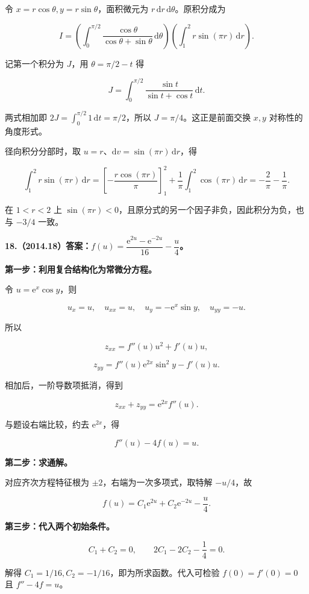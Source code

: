 \documentclass[UTF8,11pt,fontset=windows]{ctexart}
\begin{document}
令 $x=r\cos\theta,y=r\sin\theta$，面积微元为 $r\,\mathrm dr\,\mathrm d\theta$。原积分成为

$$
I=\left(\int_0^{\pi/2}\frac{\cos\theta}{\cos\theta+\sin\theta}\,\mathrm d\theta\right)
\left(\int_1^2r\sin(\pi r)\,\mathrm dr\right).
$$

记第一个积分为 $J$，用 $\theta=\pi/2-t$ 得

$$
J=\int_0^{\pi/2}\frac{\sin t}{\sin t+\cos t}\,\mathrm dt.
$$

两式相加即 $2J=\int_0^{\pi/2}1\,\mathrm dt=\pi/2$，所以 $J=\pi/4$。这正是前面交换 $x,y$ 对称性的角度形式。

径向积分分部时，取 $u=r$、$\mathrm dv=\sin(\pi r)\,\mathrm dr$，得

$$
\int_1^2r\sin(\pi r)\,\mathrm dr
=\left[-\frac{r\cos(\pi r)}\pi\right]_1^2
+\frac1\pi\int_1^2\cos(\pi r)\,\mathrm dr
=-\frac2\pi-\frac1\pi.
$$

在 $1<r<2$ 上 $\sin(\pi r)<0$，且原分式的另一个因子非负，因此积分为负，也与 $-3/4$ 一致。

\clearpage

\textbf{18.（2014.18）答案：$f(u)=\dfrac{\mathrm e^{2u}-\mathrm e^{-2u}}{16}-\dfrac u4$。}

\textbf{第一步：利用复合结构化为常微分方程。}

令 $u=\mathrm e^x\cos y$，则

$$
u_x=u,\quad u_{xx}=u,\quad
u_y=-\mathrm e^x\sin y,\quad u_{yy}=-u.
$$

所以

$$
z_{xx}=f''(u)u^2+f'(u)u,
$$

$$
z_{yy}=f''(u)\mathrm e^{2x}\sin^2y-f'(u)u.
$$

相加后，一阶导数项抵消，得到

$$
z_{xx}+z_{yy}=\mathrm e^{2x}f''(u).
$$

与题设右端比较，约去 $\mathrm e^{2x}$，得

$$
f''(u)-4f(u)=u.
$$

\textbf{第二步：求通解。}

对应齐次方程特征根为 $\pm2$，右端为一次多项式，取特解 $-u/4$，故

$$
f(u)=C_1\mathrm e^{2u}+C_2\mathrm e^{-2u}-\frac u4.
$$

\textbf{第三步：代入两个初始条件。}

$$
C_1+C_2=0,
\qquad 2C_1-2C_2-\frac14=0.
$$

解得 $C_1=1/16,C_2=-1/16$，即为所求函数。代入可检验 $f(0)=f'(0)=0$ 且 $f''-4f=u$。
\end{document}
